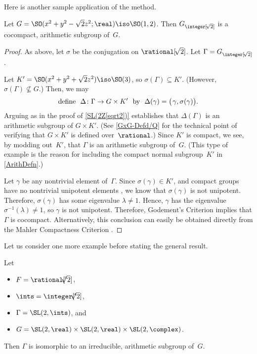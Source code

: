 Here is another sample application of the method.

\begin{eg} \label{SO(12;Z[sqrt2])}
 Let $G = \SO(x^2 + y^2 - \sqrt{2} z^2 ; \real) \iso
\SO(1,2)$. Then $G_{\integer[\!\sqrt{2}]}$ is a
cocompact, arithmetic subgroup of~$G$.
 \end{eg}

\begin{proof}
 As above, let $\sigma$ be the conjugation on
$\rational[\!\sqrt{2}]$. Let $\Gamma = G_{\integer[\!\sqrt{2}]}$.

Let $K' = \SO(x^2 + y^2 + \sqrt{2} z^2) \iso \SO(3)$, so
$\sigma(\Gamma) \subseteq K'$. (However, $\sigma(\Gamma) \not\subseteq G$.) Then, we may 
	$$ \text{define \ $\Delta
\colon \Gamma \to G \times K'$ \ by \ $\Delta(\gamma) = \bigl( \mkern2mu
 \gamma, \sigma(\gamma) \bigr)$} .$$
Arguing as in the proof of \cref{SL(2Z[sqrt2])} establishes that
$\Delta(\Gamma)$ is an arithmetic subgroup of $G \times K'$.
(See \cref{GxG-Defd/Q} for the technical point of
verifying that $G \times K'$ is defined over~$\rational$.)
Since $K'$ is compact, we see, by modding out~$K'$, that
$\Gamma$ is an arithmetic subgroup of~$G$. (This type of
example is the reason for including the compact normal
subgroup~$K'$ in \cref{ArithDefn}.)

 Let $\gamma$ be any nontrivial element of~$\Gamma$. Since
$\sigma(\gamma) \in K'$, and compact groups have no
nontrivial unipotent elements , we know that
$\sigma(\gamma)$ is not unipotent. Therefore, $\sigma(\gamma)$
has some eigenvalue $\lambda \neq 1$. Hence, $\gamma$ has
the eigenvalue $\sigma^{-1}(\lambda) \neq 1$, so $\gamma$ is
not unipotent. Therefore, Godement's Criterion
 implies that $\Gamma$ is cocompact.
Alternatively, this conclusion can easily be obtained
directly from the Mahler Compactness Criterion
 .
 \end{proof}

Let us consider one more example before stating the general
result.

\begin{eg}
 Let
 \begin{itemize}
 \item $F = \rational[\!\! \root 4\!\! \of 2]$,
 \item $\ints = \integer[\!\!\root 4\!\!\of 2]$,
 \item $\Gamma = \SL(2,\ints)$, and
 \item $G = \SL(2,\real) \times \SL(2,\real) \times
\SL(2,\complex)$.
 \end{itemize}
 Then $\Gamma$ is isomorphic to an irreducible, arithmetic
subgroup of~$G$.
 \end{eg}

